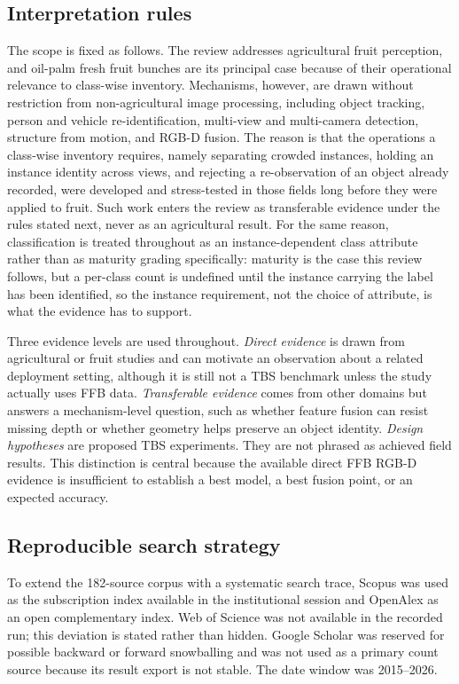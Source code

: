 \subsection{Interpretation rules}
\label{sec:rules}

The scope is fixed as follows. The review addresses agricultural fruit perception, and oil-palm fresh fruit bunches are its principal case because of their operational relevance to class-wise inventory. Mechanisms, however, are drawn without restriction from non-agricultural image processing, including object tracking, person and vehicle re-identification, multi-view and multi-camera detection, structure from motion, and RGB-D fusion. The reason is that the operations a class-wise inventory requires, namely separating crowded instances, holding an instance identity across views, and rejecting a re-observation of an object already recorded, were developed and stress-tested in those fields long before they were applied to fruit. Such work enters the review as transferable evidence under the rules stated next, never as an agricultural result. For the same reason, classification is treated throughout as an instance-dependent class attribute rather than as maturity grading specifically: maturity is the case this review follows, but a per-class count is undefined until the instance carrying the label has been identified, so the instance requirement, not the choice of attribute, is what the evidence has to support.

Three evidence levels are used throughout. \textit{Direct evidence} is drawn from agricultural or fruit studies and can motivate an observation about a related deployment setting, although it is still not a TBS benchmark unless the study actually uses FFB data. \textit{Transferable evidence} comes from other domains but answers a mechanism-level question, such as whether feature fusion can resist missing depth or whether geometry helps preserve an object identity. \textit{Design hypotheses} are proposed TBS experiments. They are not phrased as achieved field results. This distinction is central because the available direct FFB RGB-D evidence is insufficient to establish a best model, a best fusion point, or an expected accuracy.

\subsection{Reproducible search strategy}

To extend the 182-source corpus with a systematic search trace, Scopus was used as the subscription index available in the institutional session and OpenAlex as an open complementary index. Web of Science was not available in the recorded run; this deviation is stated rather than hidden. Google Scholar was reserved for possible backward or forward snowballing and was not used as a primary count source because its result export is not stable. The date window was 2015--2026.

